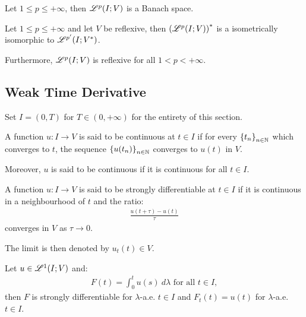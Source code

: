 \begin{theorem}
    Let $1 \leq p \leq +\infty$, then $\mathscr{L}^{p}(I; V)$ is a Banach space.
\end{theorem}

\begin{theorem}
    Let $1 \leq p \leq +\infty$ and let $V$ be reflexive, then $\left( \mathscr{L}^{p}(I; V) \right)^*$ is a isometrically isomorphic to $\mathscr{L}^{p^{\prime}}(I; V^*)$.

    Furthermore, $\mathscr{L}^{p}(I; V)$ is reflexive for all $1 < p < +\infty$.
\end{theorem}

\newpage
\subsection{Weak Time Derivative}

Set $I = (0, T)$ for $T \in (0, +\infty)$ for the entirety of this section.

\begin{definition}[Continuity]
    A function $u\colon I \rightarrow V$ is said to be continuous at $t \in I$ if for every $\left\{ t_n \right\}_{n \in \mathbb{N}}$ which converges to $t$, the sequence $\left\{ u(t_n) \right\}_{n \in \mathbb{N}}$ converges to $u(t)$ in $V$.

    Moreover, $u$ is said to be continuous if it is continuous for all $t \in I$.
\end{definition}

\begin{definition}
    A function $u\colon I \rightarrow V$ is said to be strongly differentiable at $t \in I$ if it is continuous in a neighbourhood of $t$ and the ratio:
    \begin{gather}
        \frac{u(t + \tau) - u(t)}{\tau}
    \end{gather}
    converges in $V$ as $\tau \rightarrow 0$.

    The limit is then denoted by $u_t(t) \in V$.
\end{definition}

\begin{theorem}
    Let $u \in \mathscr{L}^{1}(I; V)$ and:
    \begin{gather}
        F(t) = \int_0^t u(s) ~ d \lambda \text{ for all } t \in I,
    \end{gather}
    then $F$ is strongly differentiable for $\lambda$-a.e. $t \in I$ and $F_t(t) = u(t)$ for $\lambda$-a.e. $t \in I$.
\end{theorem}

